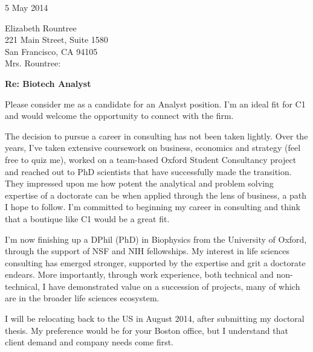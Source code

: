 \documentclass{../res}
\begin{document}
 
\begin{sloppypar}
 
%


\begin{resume} 
 
5 May 2014

Elizabeth Rountree \\
221 Main Street, Suite 1580 \\
San Francisco, CA 94105 \\

Mrs. Rountree: 

\textbf{Re: Biotech Analyst}

Please consider me as a candidate for an Analyst position. I'm an ideal fit for C1 and would welcome the opportunity to connect with the firm.

The decision to pursue a career in consulting has not been taken lightly. Over the years, I've taken extensive coursework on business, economics and strategy (feel free to quiz me), worked on a team-based Oxford Student Consultancy project and reached out to PhD scientists that have successfully made the transition. They impressed upon me how potent the analytical and problem solving expertise of a doctorate can be when applied through the lens of business, a path I hope to follow. I'm committed to beginning my career in consulting and think that a boutique like C1 would be a great fit.

I'm now finishing up a DPhil (PhD) in Biophysics from the University of Oxford, through the support of NSF and NIH fellowships. My interest in life sciences consulting has emerged stronger, supported by the expertise and grit a doctorate endears. More importantly, through work experience, both technical and non-technical, I have demonstrated value on a succession of projects, many of which are in the broader life sciences ecosystem.

I will be relocating back to the US in August 2014, after submitting my doctoral thesis. My preference would be for your Boston office, but I understand that client demand and company needs come first.


\end{resume}
\end{sloppypar}
\end{document}
